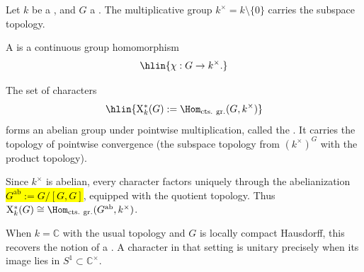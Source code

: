 \begin{definition} \label{definition:character_of_a_topological_group_valued_in_a_topological_field}

    Let $k$ be a , and $G$ a . The multiplicative group $k^\times = k \setminus \{0\}$ carries the subspace topology.

    A  is a continuous group homomorphism
    $$\hlin{\chi : G \to k^\times.}$$

    The set of characters
    $$\hlin{\mathrm{X}^*_k(G) := \Hom_{\mathrm{cts.\ gr.}}(G, k^\times)}$$
    forms an abelian group under pointwise multiplication, called the . It carries the topology of pointwise convergence (the subspace topology from $(k^\times)^G$ with the product topology).

    Since $k^\times$ is abelian, every character factors uniquely through the abelianization \hl{$G^{\mathrm{ab}} := G/[G,G]$}, equipped with the quotient topology. Thus $\mathrm{X}^*_k(G) \cong \Hom_{\mathrm{cts.\ gr.}}(G^{\mathrm{ab}}, k^\times)$.

    When $k = \mathbb{C}$ with the usual topology and $G$ is locally compact Hausdorff, this recovers the notion of a . A character in that setting is unitary precisely when its image lies in $S^1 \subset \mathbb{C}^\times$.
\end{definition}
